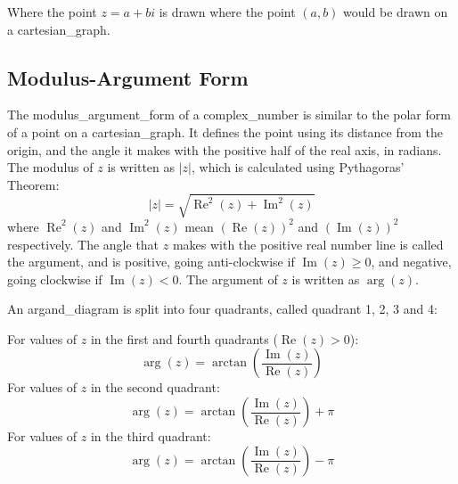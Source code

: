 \documentclass{book}
\DeclareMathOperator{\real}{Re}
\DeclareMathOperator{\imag}{Im}
\begin{document}
            Where the point $z=a+bi$ is drawn where the point $(a, b)$ would be drawn on a \gls{cartesian_graph}.
            
        \subsection{Modulus-Argument Form}
            The \gls{modulus_argument_form} of a \gls{complex_number} is similar to the polar form of a point on a \gls{cartesian_graph}.
            It defines the point using its distance from the origin, and the angle it makes with the positive half of the real axis, in \glspl{radian}.
            The \gls{modulus} of $z$ is written as $|z|$, which is calculated using Pythagoras' Theorem:
            \begin{equation}
                |z|=\sqrt{\real^2(z)+\imag^2(z)}
            \end{equation}
            where $\real^2(z)$ and $\imag^2(z)$ mean $(\real(z))^2$ and $(\imag(z))^2$ respectively.
            The angle that $z$ makes with the positive real number line is called the \gls{argument}, and is positive, going anti-clockwise if $\imag(z)\ge0$, and negative, going clockwise if $\imag(z)<0$.
            The \gls{argument} of $z$ is written as $\arg(z)$.

            An \gls{argand_diagram} is split into four \glspl{quadrant}, called \gls{quadrant} 1, 2, 3 and 4:

            \begin{center}
            \end{center}


            For values of $z$ in the first and fourth \glspl{quadrant} ($\real(z)>0$):
            \begin{equation}
                \arg(z)=\arctan\left(\frac{\imag(z)}{\real(z)}\right)
            \end{equation}
            For values of $z$ in the second \gls{quadrant}:
            \begin{equation}
                \arg(z)=\arctan\left(\frac{\imag(z)}{\real(z)}\right)+\pi
            \end{equation}
            For values of $z$ in the third \gls{quadrant}:
            \begin{equation}
                \arg(z)=\arctan\left(\frac{\imag(z)}{\real(z)}\right)-\pi
            \end{equation}
\end{document}
